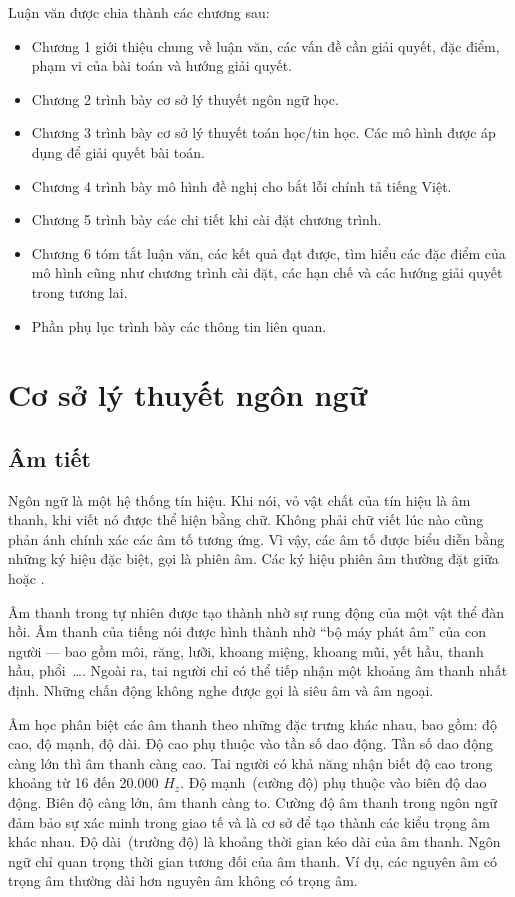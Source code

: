 \documentclass[a4paper,oneside,14pt]{extbook} %
\begin{document}
Luận văn được chia thành các chương sau:
\begin{itemize}
\item Chương 1 giới thiệu chung về luận văn, các vấn đề cần giải
  quyết, đặc điểm, phạm vi của bài toán và hướng giải quyết.
\item Chương 2 trình bày cơ sở lý thuyết ngôn ngữ học.
\item Chương 3 trình bày cơ sở lý thuyết toán học/tin học. Các mô hình
  được áp dụng để giải quyết bài toán.
\item Chương 4 trình bày mô hình đề nghị cho bắt lỗi chính tả tiếng Việt.
\item Chương 5 trình bày các chi tiết khi cài đặt chương trình.
\item Chương 6 tóm tắt luận văn, các kết quả đạt được, tìm hiểu các
  đặc điểm của mô hình   cũng như chương trình cài đặt, các hạn chế và
  các hướng giải quyết   trong tương lai.
\item Phần phụ lục trình bày các thông tin liên quan.
\end{itemize}

\chapter{Cơ sở lý thuyết ngôn ngữ}
\label{cha:vietnamese}
\minitoc


\section{Âm tiết}

Ngôn ngữ là một hệ thống tín hiệu. Khi nói, vỏ vật chất của tín hiệu
là âm thanh, khi viết nó được thể hiện bằng chữ. Không phải chữ viết
lúc nào cũng phản ánh chính xác các âm tố tương ứng. Vì vậy, các âm tố
được biểu diễn bằng những ký hiệu đặc biệt, gọi là phiên âm. Các ký
hiệu phiên âm thường đặt giữa \textipa{/\quad/} hoặc
\textipa{[\quad]}.

Âm thanh trong tự nhiên được tạo thành nhờ sự rung động của một vật
thể đàn hồi. Âm thanh của tiếng nói được hình thành nhờ ``bộ máy phát
âm'' của con người --- bao gồm môi, răng, lưỡi, khoang miệng, khoang
mũi, yết hầu, thanh hầu, phổi~\ldots{}. Ngoài ra, tai người chỉ có thể
tiếp nhận một khoảng âm thanh nhất định. Những chấn động không nghe
được gọi là siêu âm và âm ngoại.

Âm học phân biệt các âm thanh theo những đặc trưng khác nhau, bao gồm:
độ cao, độ mạnh, độ dài. Độ cao phụ thuộc vào tần số dao động. Tần số
dao động càng lớn thì âm thanh càng cao. Tai người có khả năng nhận
biết độ cao trong khoảng từ 16 đến 20.000 $H_z$. Độ mạnh~(cường độ)
phụ thuộc vào biên độ dao động. Biên độ càng lớn, âm thanh càng
to. Cường độ âm thanh trong ngôn ngữ đảm bảo sự xác minh trong giao tế
và là cơ sở để tạo thành các kiểu trọng âm khác nhau. Độ dài~(trường
độ) là khoảng thời gian kéo dài của âm thanh. Ngôn ngữ chỉ quan trọng
thời gian tương đối của âm thanh. Ví dụ, các nguyên âm có trọng âm
thường dài hơn nguyên âm không có trọng âm.
\end{document}
